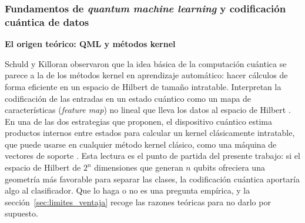 
\subsubsection{Fundamentos de \textit{quantum machine learning} y codificación cuántica de datos}

\textbf{El origen teórico: QML y métodos kernel}

Schuld y Killoran observaron que la idea básica de la computación cuántica se parece a la de los métodos kernel en aprendizaje automático: hacer cálculos de forma eficiente en un espacio de Hilbert de tamaño intratable. Interpretan la codificación de las entradas en un estado cuántico como un mapa de características (\textit{feature map}) no lineal que lleva los datos al espacio de Hilbert \cite{Schuld2019QuantumML}.
En una de las dos estrategias que proponen, el dispositivo cuántico estima productos internos entre estados para calcular un kernel clásicamente intratable, que puede usarse en cualquier método kernel clásico, como una máquina de vectores de soporte \cite{Schuld2019QuantumML}.
Esta lectura es el punto de partida del presente trabajo: si el espacio de Hilbert de $2^n$ dimensiones que generan $n$ qubits ofreciera una geometría más favorable para separar las clases, la codificación cuántica aportaría algo al clasificador. Que lo haga o no es una pregunta empírica, y la sección~\ref{sec:limites_ventaja} recoge las razones teóricas para no darlo por supuesto.

